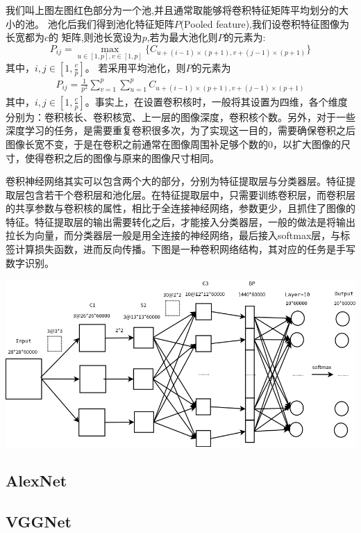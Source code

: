 我们叫上图左图红色部分为一个池,并且通常取能够将卷积特征矩阵平均划分的大小的池。
池化后我们得到池化特征矩阵$P$(Pooled feature),我们设卷积特征图像为长宽都为$c$的
矩阵,则池长宽设为$p$,若为最大池化则$P$的元素为:
\begin{equation}
P_{ij}=\max_{u\in[1,p],v\in[1,p]}\{C_{u+(i-1)\times(p+1),v+(j-1)\times(p+1)}\}
\end{equation}
其中，$i,j\in[1,\frac{c}{p}]$。
若采用平均池化，则$P$的元素为
\begin{eqnarray}
P_{ij}=\frac{1}{p^2}\sum_{v=1}^p\sum_{u=1}^pC_{u+(i-1)\times(p+1),v+(j-1)\times(p+1)}
\end{eqnarray}
其中，$i,j\in[1,\frac{c}{p}]$。事实上，在设置卷积核时，一般将其设置为四维，各个维度分别为：卷积核长、卷积核宽、上一层的图像深度，卷积核个数。另外，对于一些深度学习的任务，是需要重复卷积很多次，为了实现这一目的，需要确保卷积之后图像长宽不变，于是在卷积之前通常在图像周围补足够个数的0，以扩大图像的尺寸，使得卷积之后的图像与原来的图像尺寸相同。

卷积神经网络其实可以包含两个大的部分，分别为特征提取层与分类器层。特征提取层包含若干个卷积层和池化层。在特征提取层中，只需要训练卷积层，而卷积层的共享参数与卷积核的属性，相比于全连接神经网络，参数更少，且抓住了图像的特征。特征提取层的输出需要转化之后，才能接入分类器层，一般的做法是将输出拉长为向量，而分类器层一般是用全连接的神经网络，最后接入softmax层，与标签计算损失函数，进而反向传播。下图是一种卷积网络结构，其对应的任务是手写数字识别。

\begin{center}
\includegraphics[scale=0.4]{../figures/CNN1.png} 
\end{center}

\subsection{AlexNet}
\subsection{VGGNet}
